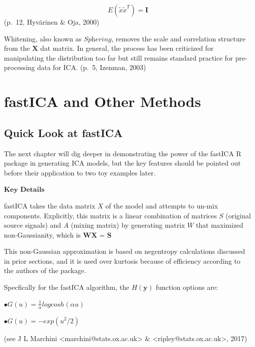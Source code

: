 \documentclass[12pt,twoside]{amherstthesis}
\begin{document}
  \[ E(\tilde{x} \tilde{x}^T)= \textbf{I} \] (p.~12, Hyvärinen \& Oja,
  2000)
  
  Whitening, also known as \(\textit{Sphering}\), removes the scale and
  correlation structure from the \(\textbf{X}\) dat matrix. In general,
  the process has been criticized for manipulating the distribution too
  far but still remains standard practice for pre-processing data for ICA.
  (p.~5, Izenman, 2003)
  
  \section{fastICA and Other Methods}\label{fastica-and-other-methods}
  
  \subsection{Quick Look at fastICA}\label{quick-look-at-fastica}
  
  The next chapter will dig deeper in demonstrating the power of the
  fastICA R package in generating ICA models, but the key features should
  be pointed out before their application to two toy examples later.
  \newline
  
  \(\textbf{Key Details}\) \newline
  
  fastICA takes the data matrix \(X\) of the model and attempts to un-mix
  components. Explicitly, this matrix is a linear combination of matrices
  \(S\) (original source signals) and \(A\) (mixing matrix) by generating
  matrix \(W\) that maximized non-Gaussianity, which is
  \(\textbf{WX = S}\)
  
  This non-Gaussian approximation is based on negentropy calculations
  discussed in prior sections, and it is used over kurtosis because of
  efficiency according to the authors of the package.
  
  Specfically for the fastICA algorithm, the \(H(\textbf{y})\) function
  options are: \newline
  
  \(\bullet G(u) = \frac{1}{\alpha}log cosh(\alpha u)\) \newline
  
  \(\bullet G(u) = -exp(u^2/2)\) \newline
  
  (see J L Marchini \textless{}marchini@stats.ox.ac.uk\textgreater{} \&
  \textless{}ripley@stats.ox.ac.uk\textgreater{}, 2017)
  
\end{document}
